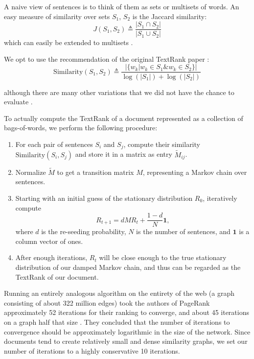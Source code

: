 A naive view of sentences is to think of them as sets or multisets of words.
An easy measure of similarity over sets $S_1$, $S_2$ is the Jaccard similarity:
\begin{equation*}
  J(S_1, S_2) \triangleq \frac{|S_1 \cap S_2|}{|S_1 \cup S_2|}
\end{equation*}
which can easily be extended to multisets \cite{wiki:Multiset}.

We opt to use the recommendation of the original TextRank paper \cite{textrank}:
\begin{equation*}
  \text{Similarity}(S_1, S_2) \triangleq \frac{ | \{ w_k | w_k \in S_1 \& w_k \in S_2 \} |}{\log(|S_1|) + \log(|S_2|)}
\end{equation*}

although there are many other variations that we did not have the chance to evaluate \cite{textrank-sim-var}.

To actually compute the TextRank of a document represented as a collection of bags-of-words, we perform the following procedure:
\begin{enumerate}
\item For each pair of sentences $S_i$ and $S_j$, compute their similarity $\text{Similarity}(S_i, S_j)$ and store it in a matrix as entry $\tilde{M}_{ij}$.
\item Normalize $\tilde{M}$ to get a transition matrix $M$, representing a Markov chain over sentences.
\item Starting with an initial guess of the stationary distribution $R_0$, iteratively compute 
  \[
    R_{t+1} = dMR_t + \frac{1-d}{N} \mathbf{1},
  \]
where $d$ is the re-seeding probability, $N$ is the number of sentences, and $\mathbf{1}$ is a column vector of ones.
\item After enough iterations, $R_t$ will be close enough to the true stationary distribution of our damped Markov chain, and thus can be regarded as the TextRank of our document.
\end{enumerate}

Running an entirely analogous algorithm on the entirety of the web (a graph consisting of about 322 million edges) took the authors of PageRank approximately 52 iterations for their ranking to converge, and about 45 iterations on a graph half that size \cite{wiki:PageRank}. 
They concluded that the number of iterations to convergence should be approximately logarithmic in the size of the network.
Since documents tend to create relatively small and dense similarity graphs, we set our number of iterations to a highly conservative 10 iterations.

